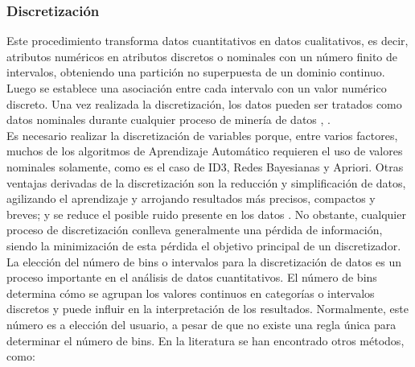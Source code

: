 \subsubsection*{Discretización} \label{sub-epigrafe-disc}
Este procedimiento transforma datos cuantitativos en datos cualitativos, es decir, atributos numéricos en atributos discretos o nominales con un número finito de intervalos, obteniendo una partición no superpuesta de un dominio continuo. Luego se establece una asociación entre cada intervalo con un valor numérico discreto. Una vez realizada la discretización, los datos pueden ser tratados como datos nominales durante cualquier proceso de minería de datos \citep{garcia2015data}, \citep{garcia2012survey}. \\
Es necesario realizar la discretización de variables porque, entre varios factores, muchos de los algoritmos de Aprendizaje Automático requieren el uso de valores nominales solamente, como es el caso de ID3, Redes Bayesianas y Apriori. Otras ventajas derivadas de la discretización son la reducción y simplificación de datos, agilizando el aprendizaje y arrojando resultados más precisos, compactos y breves; y se reduce el posible ruido presente en los datos \citep{garcia2012survey}. No obstante, cualquier proceso de discretización conlleva generalmente una pérdida de información, siendo la minimización de esta pérdida el objetivo principal de un discretizador. \\
La elección del número de bins o intervalos para la discretización de datos es un proceso importante en el análisis de datos cuantitativos. El número de bins determina cómo se agrupan los valores continuos en categorías o intervalos discretos y puede influir en la interpretación de los resultados. Normalmente, este número es a elección del usuario, a pesar de que no existe una regla única para determinar el número de bins. En la literatura se han encontrado otros métodos, como:
